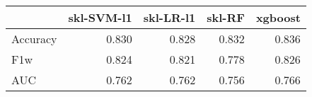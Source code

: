 \begin{tabular}{lrrrr}
\toprule
{} &  skl-SVM-l1 &  skl-LR-l1 &  skl-RF &  xgboost \\
\midrule
Accuracy &       0.830 &      0.828 &   0.832 &    0.836 \\
F1w      &       0.824 &      0.821 &   0.778 &    0.826 \\
AUC      &       0.762 &      0.762 &   0.756 &    0.766 \\
\bottomrule
\end{tabular}
